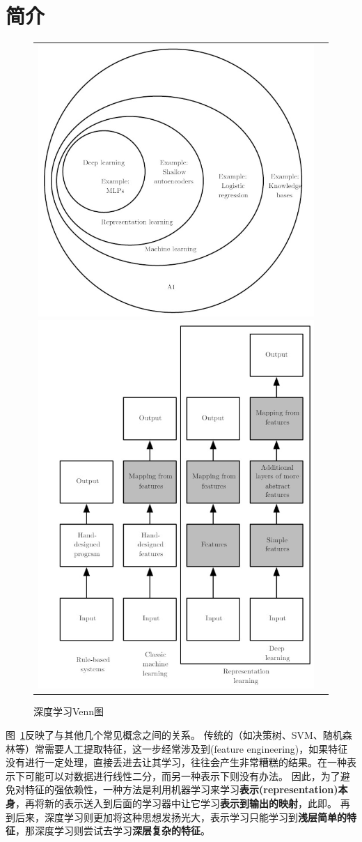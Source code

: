 
\section{简介} %
\begin{figure}[!htbp]
\centering
\begin{tabular}{cc}
\includegraphics[width=0.5\linewidth]{fig/dl_venn.jpg}
\includegraphics[width=0.5\linewidth]{fig/dl_flowchart.jpg}
\end{tabular}
\caption{深度学习Venn图}
\label{fig:venn}
\end{figure}

图~\ref{fig:venn}反映了与其他几个常见概念之间的关系。
传统的（如决策树、SVM、随机森林等）常需要人工提取特征，这一步经常涉及到(feature engineering)，如果特征没有进行一定处理，直接丢进去让其学习，往往会产生非常糟糕的结果。在一种表示下可能可以对数据进行线性二分，而另一种表示下则没有办法。
因此，为了避免对特征的强依赖性，一种方法是利用机器学习来学习\textbf{表示(representation)本身}，再将新的表示送入到后面的学习器中让它学习\textbf{表示到输出的映射}，此即。
再到后来，深度学习则更加将这种思想发扬光大，表示学习只能学习到\textbf{浅层简单的特征}，那深度学习则尝试去学习\textbf{深层复杂的特征}。

